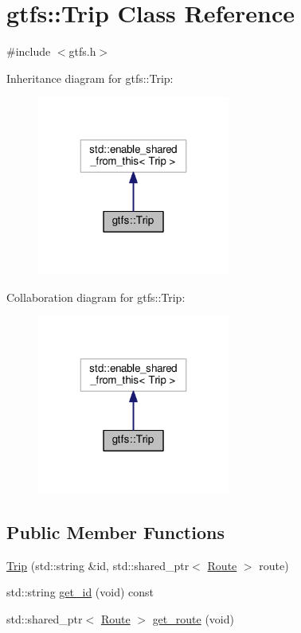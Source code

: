 \hypertarget{classgtfs_1_1Trip}{}\section{gtfs\+:\+:Trip Class Reference}
\label{classgtfs_1_1Trip}


{\ttfamily \#include $<$gtfs.\+h$>$}



Inheritance diagram for gtfs\+:\+:Trip\+:\nopagebreak
\begin{figure}[H]
\begin{center}
\leavevmode
\includegraphics[width=179pt]{classgtfs_1_1Trip__inherit__graph}
\end{center}
\end{figure}


Collaboration diagram for gtfs\+:\+:Trip\+:\nopagebreak
\begin{figure}[H]
\begin{center}
\leavevmode
\includegraphics[width=179pt]{classgtfs_1_1Trip__coll__graph}
\end{center}
\end{figure}
\subsection*{Public Member Functions}
\begin{DoxyCompactItemize}
\item 
\hyperlink{classgtfs_1_1Trip_a3014ee32fdb5abd550ad20088c91aae6}{Trip} (std\+::string \&id, std\+::shared\+\_\+ptr$<$ \hyperlink{classgtfs_1_1Route}{Route} $>$ route)
\item 
std\+::string \hyperlink{classgtfs_1_1Trip_ac4c80cbf34f7c715104cc1c33b082f58}{get\+\_\+id} (void) const
\item 
std\+::shared\+\_\+ptr$<$ \hyperlink{classgtfs_1_1Route}{Route} $>$ \hyperlink{classgtfs_1_1Trip_a2b6cc135946d7e7db7bb35951987e35c}{get\+\_\+route} (void)
\end{DoxyCompactItemize}


